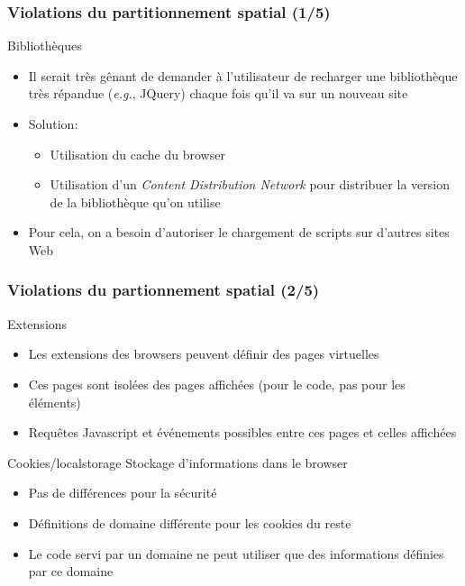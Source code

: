 \begin{reveals}
\begin{frame}
  \frametitle{Violations du partitionnement spatial (1/5)}

  \begin{block}{Biblioth{\`e}ques}
    \begin{itemize}
    \item Il serait tr{\`e}s g{\^e}nant de demander {\`a} l'utilisateur de
      recharger une biblioth{\`e}que tr{\`e}s r{\'e}pandue (\textit{e.g.}, JQuery)
      chaque fois qu'il va sur un nouveau site
    \item Solution:
      \begin{itemize}
      \item Utilisation du cache du browser
      \item Utilisation d'un \emph{Content Distribution Network} pour
        distribuer la version de la biblioth{\`e}que qu'on utilise
      \end{itemize}
    \item Pour cela, on a besoin d'autoriser le chargement de scripts
      sur d'autres sites Web
    \end{itemize}
  \end{block}
  
  \pause


\end{frame}


\begin{frame}
  \frametitle{Violations du partionnement spatial (2/5)}

  \begin{block}{Extensions}
    \begin{itemize}
    \item Les extensions des browsers peuvent d{\'e}finir des pages
      virtuelles
    \item Ces pages sont isol{\'e}es des pages affich{\'e}es (pour le
      code, pas pour les \'el\'ements)
    \item Requ{\^e}tes Javascript et \'ev\'enements possibles entre ces
      pages et celles affich{\'e}es
    \end{itemize}
  \end{block}

  \begin{block}{Cookies/localstorage}
    Stockage d'informations dans le browser
    \begin{itemize}
    \item Pas de diff{\'e}rences pour la s{\'e}curit{\'e}
    \item D{\'e}finitions de domaine diff{\'e}rente pour les cookies du reste
    \item Le code servi par un domaine ne peut utiliser que des
      informations d{\'e}finies par ce domaine
    \end{itemize}
  \end{block}


\end{frame}
\end{reveals}
